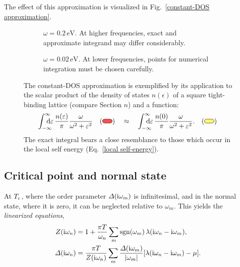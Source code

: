 The effect of this approximation is visualized in Fig.~\ref{constant-DOS
approximation}.

\begin{figure}
    \small
    \begin{subfigure}{6.75cm}
        
        \caption{$\omega = 0.2\,\mathrm{eV}$. At higher frequencies, exact and
                 approximate integrand may differ considerably.}
    \end{subfigure}%
    \hfill%
    \begin{subfigure}{6.75cm}
        
        \caption{$\omega = 0.02\,\mathrm{eV}$. At lower frequencies, points for
                 numerical integration must be chosen carefully.}
    \end{subfigure}
    \captionsetup{singlelinecheck=off}
    \caption[Constant-DOS approximation]{ %
        The constant-DOS approximation is exemplified by its application to the
        scalar product of the density of states $n(\epsilon)$ of a square
        tight-binding lattice (compare Section $n$) and a 
        function:
        \begin{align*}
            \int \from{-\infty} \till \infty
            \D \epsilon \, \frac {n(\epsilon)} \pi
            \frac \omega {\omega^2 + \epsilon^2}
            \quad
            (\tikz \draw [fill=red!70!white, rounded corners=3pt]
                (0, 0) rectangle (0.5, 0.2);)
            \quad \approx \quad
            \int \from{-\infty} \till \infty
            \D \epsilon \, \frac {n(0)} \pi
            \frac \omega {\omega^2 + \epsilon^2}.
            \quad
            (\tikz \draw [fill=yellow!60!white, rounded corners=3pt]
                (0, 0) rectangle (0.5, 0.2);)
        \end{align*}
        The exact integral bears a close resemblance to those which occur in the
        local self energy (Eq.~\ref{local self-energy}).
        }
    \label{constant-DOS approximation}
\end{figure}

\subsection{Critical point and normal state}

At $T \sb{\text{c}}$, where the order parameter $\varDelta(\mathrm i \omega_m)$ is infinitesimal,
and in the normal state, where it is zero, it can be neglected relative to
$\omega_m$. This yields the \emph{linearized  equations},
%
\begin{subequations} \label{linearized Eliashberg equations}
    \begin{align}
        Z(\mathrm i \omega_n) &= 1 + \frac{\pi T}{\omega_n} \sum_m
        \operatorname{sgn}(\omega_m) \, \lambda(\mathrm i \omega_n - \mathrm i \omega_m),
        \\
        \varDelta(\mathrm i \omega_n) &= \frac{\pi T}{Z(\mathrm i \omega_n)} \sum_m
        \frac{\varDelta(\mathrm i \omega_m)}{|\omega_m|}
        [\lambda(\mathrm i \omega_n - \mathrm i \omega_m) - \mu].
    \end{align}
\end{subequations}

